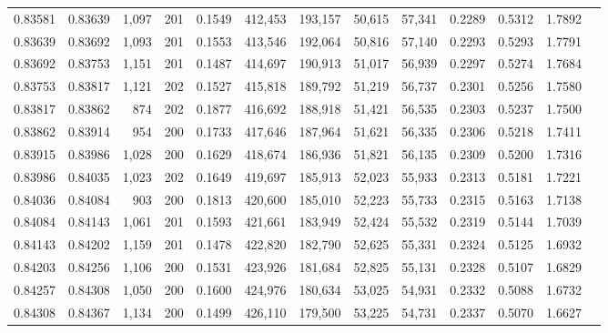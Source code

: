 \begin{tabular}{rrrrrrrrrrrrr}
0.83581 & 0.83639 & 1,097 & 201 &                                     0.1549 & 412,453 & 193,157 &  50,615 &  57,341 & 0.2289 & 0.5312 & 1.7892 \\
0.83639 & 0.83692 & 1,093 & 201 &                                     0.1553 & 413,546 & 192,064 &  50,816 &  57,140 & 0.2293 & 0.5293 & 1.7791 \\
0.83692 & 0.83753 & 1,151 & 201 &                                     0.1487 & 414,697 & 190,913 &  51,017 &  56,939 & 0.2297 & 0.5274 & 1.7684 \\
0.83753 & 0.83817 & 1,121 & 202 &                                     0.1527 & 415,818 & 189,792 &  51,219 &  56,737 & 0.2301 & 0.5256 & 1.7580 \\
0.83817 & 0.83862 &   874 & 202 &                                     0.1877 & 416,692 & 188,918 &  51,421 &  56,535 & 0.2303 & 0.5237 & 1.7500 \\
0.83862 & 0.83914 &   954 & 200 &                                     0.1733 & 417,646 & 187,964 &  51,621 &  56,335 & 0.2306 & 0.5218 & 1.7411 \\
0.83915 & 0.83986 & 1,028 & 200 &                                     0.1629 & 418,674 & 186,936 &  51,821 &  56,135 & 0.2309 & 0.5200 & 1.7316 \\
0.83986 & 0.84035 & 1,023 & 202 &                                     0.1649 & 419,697 & 185,913 &  52,023 &  55,933 & 0.2313 & 0.5181 & 1.7221 \\
0.84036 & 0.84084 &   903 & 200 &                                     0.1813 & 420,600 & 185,010 &  52,223 &  55,733 & 0.2315 & 0.5163 & 1.7138 \\
0.84084 & 0.84143 & 1,061 & 201 &                                     0.1593 & 421,661 & 183,949 &  52,424 &  55,532 & 0.2319 & 0.5144 & 1.7039 \\
0.84143 & 0.84202 & 1,159 & 201 &                                     0.1478 & 422,820 & 182,790 &  52,625 &  55,331 & 0.2324 & 0.5125 & 1.6932 \\
0.84203 & 0.84256 & 1,106 & 200 &                                     0.1531 & 423,926 & 181,684 &  52,825 &  55,131 & 0.2328 & 0.5107 & 1.6829 \\
0.84257 & 0.84308 & 1,050 & 200 &                                     0.1600 & 424,976 & 180,634 &  53,025 &  54,931 & 0.2332 & 0.5088 & 1.6732 \\
0.84308 & 0.84367 & 1,134 & 200 &                                     0.1499 & 426,110 & 179,500 &  53,225 &  54,731 & 0.2337 & 0.5070 & 1.6627 \\

\end{tabular}
